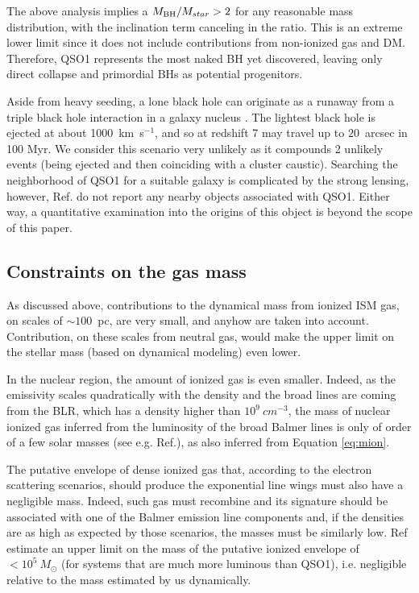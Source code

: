 \documentclass[twocolumn, fleqn]{doc_class}
\begin{document}
The above analysis implies a $M_{\rm BH}/M_{star} > 2$ for any reasonable mass distribution, with the inclination term canceling in the ratio. This is an extreme lower limit since it does not include contributions from non-ionized gas and DM. Therefore, QSO1 represents the most naked BH yet discovered, leaving only direct collapse and primordial BHs as potential progenitors. 

Aside from heavy seeding, a lone black hole can originate as a runaway from a triple black hole interaction in a galaxy nucleus . The lightest black hole is ejected at about 1000~km~s$^{-1}$, and so at redshift 7 may travel up to $20$~arcsec in 100 Myr. We consider this scenario very unlikely as it compounds 2 unlikely events (being ejected and then coinciding with a cluster caustic). Searching the neighborhood of QSO1 for a suitable galaxy is complicated by the strong lensing, however, Ref.  do not report any nearby objects associated with QSO1. Either way, a quantitative examination into the origins of this object is beyond the scope of this paper.

\subsection*{Constraints on the gas mass}

As discussed above,
 contributions to the dynamical mass from ionized ISM gas, on scales of $\sim 100$~pc, are very small, and anyhow are taken into account. Contribution, on these scales from neutral gas, would make the upper limit on the stellar mass (based on dynamical modeling) even lower.

In the nuclear region, the amount of ionized gas is even  smaller. Indeed, as the emissivity scales quadratically with the density and the broad lines are coming from the BLR, which has a density higher than $10^9~cm^{-3}$, the mass of nuclear ionized gas inferred from the luminosity of the broad Balmer lines is only of order of a few solar masses  (see e.g. Ref.), as also inferred from Equation \ref{eq:mion}.

The putative envelope of dense ionized gas that, according to the electron scattering scenarios, should produce the exponential line wings must also have a negligible mass. Indeed, such gas must recombine and its signature should be associated with one of the Balmer emission line components and, if the densities are as high as expected by those scenarios, the masses must be similarly low. Ref estimate an upper limit on the mass of the putative ionized envelope of $<10^5~M_\odot$ (for systems that are much more  luminous than QSO1), i.e. negligible relative to the mass estimated by us dynamically.
\end{document}
